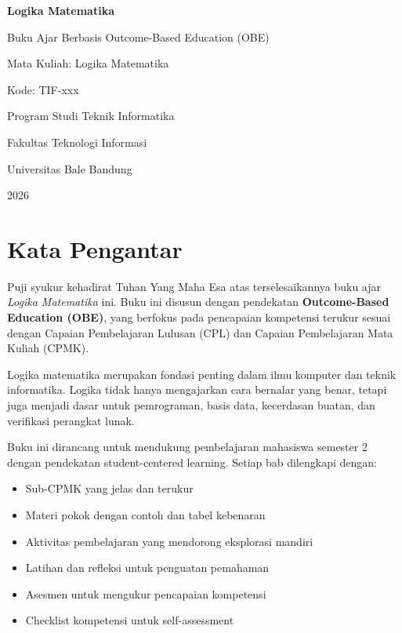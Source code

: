 \frontmatter

\begin{titlepage}
  \centering
  \vspace*{1cm}
  {\LARGE\bfseries Logika Matematika\par}
  \vspace{0.5cm}
  {\large Buku Ajar Berbasis Outcome-Based Education (OBE)\par}
  \vspace{1cm}
  {\large Mata Kuliah: Logika Matematika\par}
  {\large Kode: TIF-xxx\par}
  \vspace{2cm}
  {\large Program Studi Teknik Informatika\par}
  {\large Fakultas Teknologi Informasi\par}
  {\large Universitas Bale Bandung\par}
  \vfill
  {\large 2026\par}
\end{titlepage}

\cleardoublepage

\chapter*{Kata Pengantar}

Puji syukur kehadirat Tuhan Yang Maha Esa atas terselesaikannya buku ajar \textit{Logika Matematika} ini. Buku ini disusun dengan pendekatan \textbf{Outcome-Based Education (OBE)}, yang berfokus pada pencapaian kompetensi terukur sesuai dengan Capaian Pembelajaran Lulusan (CPL) dan Capaian Pembelajaran Mata Kuliah (CPMK).

Logika matematika merupakan fondasi penting dalam ilmu komputer dan teknik informatika. Logika tidak hanya mengajarkan cara bernalar yang benar, tetapi juga menjadi dasar untuk pemrograman, basis data, kecerdasan buatan, dan verifikasi perangkat lunak.

Buku ini dirancang untuk mendukung pembelajaran mahasiswa semester 2 dengan pendekatan student-centered learning. Setiap bab dilengkapi dengan:
\begin{itemize}
  \item Sub-CPMK yang jelas dan terukur
  \item Materi pokok dengan contoh dan tabel kebenaran
  \item Aktivitas pembelajaran yang mendorong eksplorasi mandiri
  \item Latihan dan refleksi untuk penguatan pemahaman
  \item Asesmen untuk mengukur pencapaian kompetensi
  \item Checklist kompetensi untuk self-assessment
\end{itemize}

